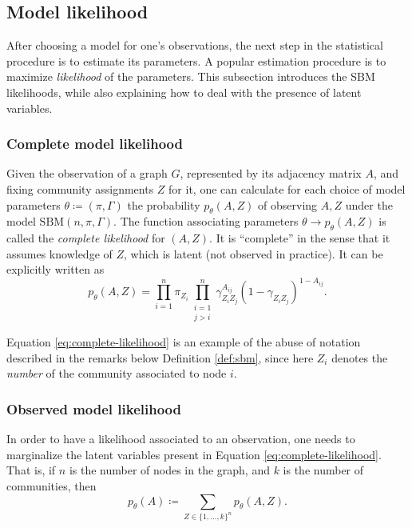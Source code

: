 \documentclass[../../main.tex]{subfiles} %
\begin{document}
\subsection{Model likelihood}
After choosing a model for one's observations, the next step in the statistical 
procedure is to estimate its parameters. A popular estimation procedure is to 
maximize \textit{likelihood} of the parameters. This subsection introduces 
the SBM likelihoods, while also explaining how to deal with the presence of 
latent variables.

\subsubsection{Complete model likelihood}
Given the observation of a graph \(G\), represented by its adjacency matrix 
\(A\), and fixing community assignments \(Z\) for it, one can calculate for 
each 
choice of model parameters \(\theta \coloneqq (\pi, \Gamma)\) the 
probability \(p_{\theta} (A, Z)\) of observing \(A, Z\) under the model 
\(\text{SBM}(n, \pi, 
\Gamma)\). 
The function associating parameters \(\theta \to p_{\theta} (A, 
Z)\) is called the \textit{complete likelihood} for \((A, Z)\). It is ``complete'' in 
the sense that it assumes knowledge of \(Z\), which is latent (not observed in 
practice). It can be explicitly written as
\begin{equation} \label{eq:complete-likelihood}
	p_{\theta}(A, Z) = \prod_{i=1}^{n} \pi_{Z_i} \prod_{\substack{i=1 \\ 
	j>i}}^n 
	\gamma_{Z_i 
		Z_j}^{A_{ij}} (1 - \gamma_{Z_i Z_j})^{1 - A_{ij}}.
\end{equation}

\begin{remark}
	Equation \eqref{eq:complete-likelihood} is an example of the abuse of 
	notation described in the remarks below Definition \ref{def:sbm}, 
	since here 
	\(Z_i\) denotes the \textit{number} of the community associated to 
	node \(i\).
\end{remark}

\subsubsection{Observed model likelihood}
In order to have a likelihood associated to an observation, one needs to 
marginalize the latent variables present in Equation 
\eqref{eq:complete-likelihood}. That is, if \(n\) is the number of 
nodes in the 
graph, and \(k\) is the number of communities, then
\begin{equation} \label{eq:observed-likelihood}
	p_\theta(A) \coloneqq \sum_{Z \in \{1, \dots, k\}^n} p_\theta(A, Z).
\end{equation}
\end{document}

